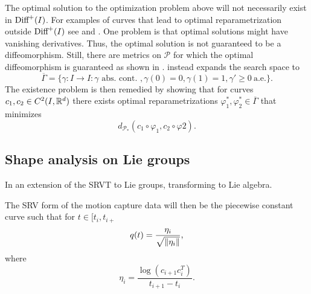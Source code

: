 The optimal solution to the optimization problem above will not necessarily exist in \(\text{Diff}^+(I)\). For examples of curves that lead to optimal reparametrization outside \(\text{Diff}^+(I)\) see \cite[p.11]{bauer2015why} and \cite[Section 3.2]{woien2019}. One problem is that optimal solutions might have vanishing derivatives. Thus, the optimal solution is not guaranteed to be a diffeomorphism. Still, there are metrics on \(\mathcal{P}\) for which the optimal diffeomorphism is guaranteed as shown in \cite{bauer2014overview}. \citeauthor{bruveris1016_srvtexample} \cite{bruveris1016_srvtexample} instead expands the search space to
\begin{equation}
  \overline \Gamma = \{\gamma : I \rightarrow I : \gamma \text{\ abs. \ cont. }, \gamma(0) = 0, \gamma(1) = 1, \gamma' \geq 0 \ \text{a.e.}\}.
\end{equation}
The existence problem is then remedied by showing that for curves \(c_1, c_2 \in C^2(I,\mathbb{R}^d)\) there exists optimal reparametrizations \(\varphi_1^*, \varphi_2^* \in \overline{ \Gamma}\) that minimizes
\begin{equation}
  d_{\mathcal{P}_*}(c_1 \circ \varphi_1, c_2 \circ \varphi2). 
\end{equation}

\subsection{Shape analysis on Lie groups}\label{subsec:shape-lie}
In \cite{celledoni2016} an extension of the SRVT to Lie groups, transforming to Lie algebra. 

The SRV form of the motion capture data will then be the piecewise constant curve such that for \(t \in [t_i, t_{i+}\)
\begin{equation*}
  q(t) = \frac{\eta_i}{\sqrt{\norm{\eta_i}}}, 
\end{equation*}
where 
\begin{equation*}
  \eta_i = \frac{\log(c_{i+1}c_{i}^T)}{t_{i+1} -  t_{i}}. 
\end{equation*}